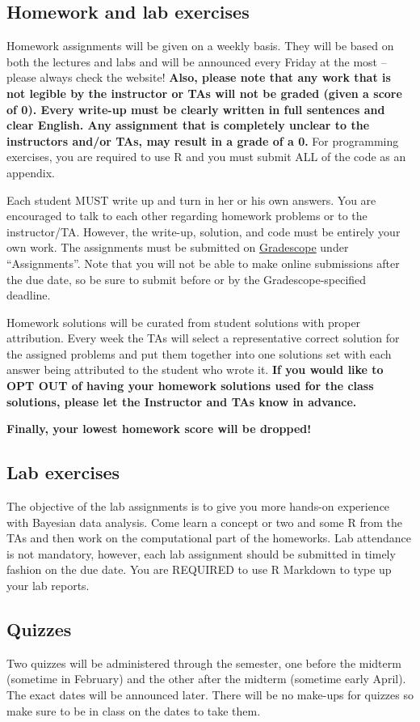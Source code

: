 \documentclass[11pt, a4paper]{article}
\begin{document}
\subsection{Homework and lab exercises}
Homework assignments will be given on a weekly basis. They will be based on both the lectures and labs and will be announced every Friday at the most – please always check the website! \textbf{Also, please note that any work that is not legible by the instructor or TAs will not be graded (given a score  of 0). Every write-up must be clearly written in full sentences and clear English. Any assignment that is completely unclear to the instructors and/or TAs, may result in a grade of a 0.} For programming exercises, you are required to use R and you must submit ALL of the code as an appendix.  

Each student MUST write up and turn in her or his own answers. You are encouraged to talk to each other regarding homework problems or to the instructor/TA. However, the write-up, solution, and code must be entirely your own work. The assignments must be submitted on \href{https://www.gradescope.com/courses/77790/assignments}{Gradescope} under ``Assignments''. Note that you will not be able to make online submissions after the due date, so be sure to submit before or by the Gradescope-specified deadline.

Homework solutions will be curated from student solutions with proper attribution. Every week the TAs will select a representative correct solution for the assigned problems and put them together into one solutions set with each answer being attributed to the student who wrote it. \textbf{If you would like to OPT OUT of having your homework solutions used for the class solutions, please let the Instructor and TAs know in advance.}

\textbf{Finally, your lowest homework score will be dropped!}

\subsection{Lab exercises}
The objective of the lab assignments is to give you more hands-on experience with Bayesian data analysis. Come learn a concept or two and some R from the TAs and then work on the computational part of the homeworks. Lab attendance is not mandatory, however, each lab assignment should be submitted in timely fashion on the due date. You are REQUIRED to use R Markdown to type up your lab reports.

\subsection{Quizzes}
Two quizzes will be administered through the semester, one before the midterm (sometime in February) and the other after the midterm (sometime early April). The exact dates will be announced later. There will be no make-ups for quizzes so make sure to be in class on the dates to take them.
\end{document}
